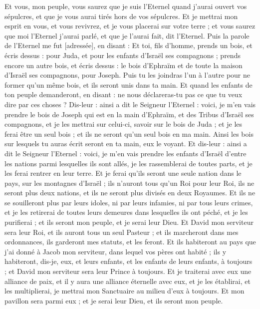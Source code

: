\begin{multicols}{2}
Et vous, mon peuple, vous saurez que je suis l'Eternel quand j'aurai ouvert vos sépulcres, et que je vous aurai tirés hors de vos sépulcres.
Et je mettrai mon esprit en vous, et vous revivrez, et je vous placerai sur votre terre ; et vous saurez que moi l'Eternel j'aurai parlé, et que je l'aurai fait, dit l'Eternel.
Puis la parole de l'Eternel me fut [adressée], en disant :
Et toi, fils d'homme, prends un bois, et écris dessus : pour Juda, et pour les enfants d'Israël ses compagnons ; prends encore un autre bois, et écris dessus : le bois d'Ephraïm et de toute la maison d'Israël ses compagnons, pour Joseph.
Puis tu les joindras l'un à l'autre pour ne former qu'un même bois, et ils seront unis dans ta main.
Et quand les enfants de ton peuple demanderont, en disant : ne nous déclareras-tu pas ce que tu veux dire par ces choses ?
Dis-leur : ainsi a dit le Seigneur l'Eternel : voici, je m'en vais prendre le bois de Joseph qui est en la main d'Ephraïm, et des Tribus d'Israël ses compagnons, et je les mettrai sur celui-ci, savoir sur le bois de Juda ; et je les ferai être un seul bois ; et ils ne seront qu'un seul bois en ma main.
Ainsi les bois sur lesquels tu auras écrit seront en ta main, eux le voyant.
Et dis-leur : ainsi a dit le Seigneur l'Eternel : voici, je m'en vais prendre les enfants d'Israël d'entre les nations parmi lesquelles ils sont allés, je les rassemblerai de toutes parts, et je les ferai rentrer en leur terre.
Et je ferai qu'ils seront une seule nation dans le pays, sur les montagnes d'Israël ; ils n'auront tous qu'un Roi pour leur Roi, ils ne seront plus deux nations, et ils ne seront plus divisés en deux Royaumes.
Et ils ne se souilleront plus par leurs idoles, ni par leurs infamies, ni par tous leurs crimes, et je les retirerai de toutes leurs demeures dans lesquelles ils ont péché, et je les purifierai ; et ils seront mon peuple, et je serai leur Dieu.
Et David mon serviteur sera leur Roi, et ils auront tous un seul Pasteur ; et ils marcheront dans mes ordonnances, ils garderont mes statuts, et les feront.
Et ils habiteront au pays que j'ai donné à Jacob mon serviteur, dans lequel vos pères ont habité ; ils y habiteront, dis-je, eux, et leurs enfants, et les enfants de leurs enfants, à toujours ; et David mon serviteur sera leur Prince à toujours.
Et je traiterai avec eux une alliance de paix, et il y aura une alliance éternelle avec eux, et je les établirai, et les multiplierai, je mettrai mon Sanctuaire au milieu d'eux à toujours.
Et mon pavillon sera parmi eux ; et je serai leur Dieu, et ils seront mon peuple.

\end{multicols}
